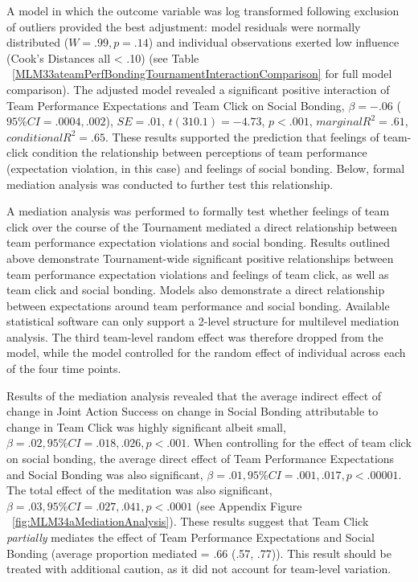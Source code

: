 A model in which the outcome variable was log transformed following exclusion of outliers provided the best adjustment: model residuals were normally distributed ($W = .99, p = .14$) and individual observations exerted low influence (Cook's Distances all < .10) (see Table ~\ref{MLM33ateamPerfBondingTournamentInteractionComparison} for full model comparison). The adjusted model revealed a significant positive interaction of Team Performance Expectations and Team Click on Social Bonding, $\beta = -.06$ ($95\% CI =  .0004, .002$), $SE = .01$, $t(310.1) = -4.73$, $p < .001$, $marginal R^2 = .61$, $conditional R^2 = .65$. These results supported the prediction that feelings of team-click condition the relationship between perceptions of team performance (expectation violation, in this case) and feelings of social bonding.  Below, formal mediation analysis was conducted to further test this relationship.


       

A mediation analysis was performed to formally test whether feelings of team click over the course of the Tournament mediated a direct relationship between team performance expectation violations and social bonding.  Results outlined above demonstrate Tournament-wide significant positive relationships between team performance expectation violations and feelings of team click, as well as team click and social bonding. Models also demonstrate a direct relationship between expectations around team performance and social bonding.  Available statistical software can only support a 2-level structure for multilevel mediation analysis. The third team-level random effect was therefore dropped from the model, while the model controlled for the random effect of individual across each of the four time points.

Results of the mediation analysis revealed that the average indirect effect of change in Joint Action Success on change in Social Bonding attributable to change in Team Click was highly significant albeit small, $\beta = .02, 95\% CI = .018 , .026, p < .001$.  When controlling for the effect of team click on social bonding, the average direct effect of Team Performance Expectations and Social Bonding was also significant, $\beta = .01, 95\% CI = .001 , .017, p < .00001$.  The total effect of the meditation was also significant, $\beta = .03, 95\% CI = .027, .041, p < .0001$ (see Appendix Figure ~\ref{fig:MLM34aMediationAnalysis}).  These results suggest that Team Click \textit{partially} mediates the effect of Team Performance Expectations and Social Bonding (average proportion mediated = .66 (.57, .77)).  This result should be treated with additional caution, as it did not account for team-level variation.

